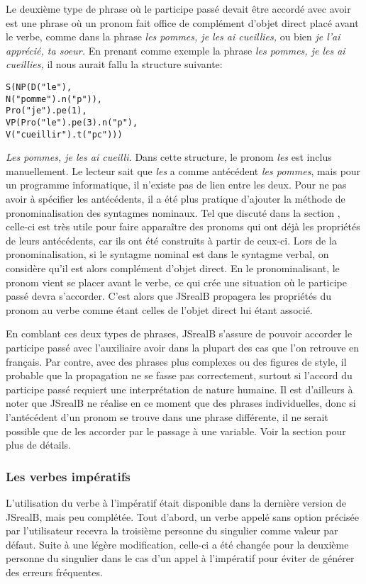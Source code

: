 \documentclass[11pt]{article} %
\newcommand{\real}[1]{\emph{#1}}
\begin{document}
Le deuxième type de phrase où le participe passé devait être accordé
avec avoir est une phrase où un pronom fait office de complément d'objet
direct placé avant le verbe, comme dans la phrase \emph{les pommes,
je les ai cueillies, }ou bien \emph{je l'ai apprécié, ta soeur. }En
prenant comme exemple la phrase \emph{les pommes, je les ai cueillies,
}il nous aurait fallu la structure suivante: 
\begin{alltt}
S(NP(D("le"),
     N("pomme").n("p")),
  Pro("je").pe(1),
  VP(Pro("le").pe(3).n("p"),
     V("cueillir").t("pc")))
\end{alltt}
\real{Les pommes, je les ai cueilli.}
Dans cette structure, le pronom \emph{les} est inclus manuellement.
Le lecteur sait que \emph{les} a comme antécédent \emph{les pommes},
mais pour un programme informatique, il n'existe pas de lien entre
les deux. Pour ne pas avoir à spécifier les antécédents, il a été
plus pratique d'ajouter la méthode de pronominalisation des syntagmes
nominaux. Tel que discuté dans la section \hyperref[pronomi]{}, celle-ci est très utile pour
faire apparaître des pronoms qui ont déjà les propriétés de leurs
antécédents, car ils ont été construits à partir de ceux-ci. Lors
de la pronominalisation, si le syntagme nominal est dans le syntagme
verbal, on considère qu'il est alors complément d'objet direct. En
le pronominalisant, le pronom vient se placer avant le verbe, ce qui
crée une situation où le participe passé devra s'accorder. C'est alors
que JSrealB propagera les propriétés du pronom au verbe comme étant
celles de l'objet direct lui étant associé.

En comblant ces deux types de phrases, JSrealB s'assure
de pouvoir accorder le participe passé avec l'auxiliaire avoir dans
la plupart des cas que l'on retrouve en français. Par contre, avec
des phrases plus complexes ou des figures de style, il probable que
la propagation ne se fasse pas correctement, surtout si l'accord du
participe passé requiert une interprétation de nature humaine. Il
est d'ailleurs à noter que JSrealB ne réalise en ce moment que des
phrases individuelles, donc si l'antécédent d'un pronom se trouve
dans une phrase différente, il ne serait possible que de les accorder
par le passage à une variable. Voir la section \hyperref[clone]{}pour plus de détails.


\subsubsection{Les verbes impératifs}
\label{imperatif}
L'utilisation du verbe à l'impératif était disponible dans la dernière
version de JSrealB, mais peu complétée. Tout d'abord, un verbe appelé
sans option précisée par l'utilisateur recevra la troisième personne
du singulier comme valeur par défaut. Suite à une légère modification,
celle-ci a été changée pour la deuxième personne du singulier dans
le cas d'un appel à l'impératif pour éviter de générer des erreurs
fréquentes.
\end{document}
